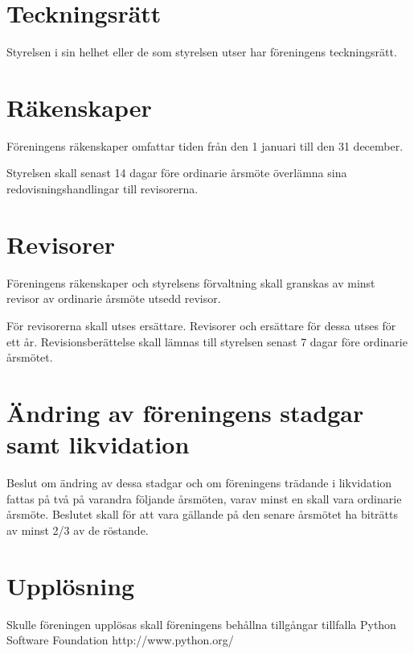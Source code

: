 \documentclass[11pt, a4paper]{article}
\begin{document}
\section{Teckningsrätt}
Styrelsen i sin helhet eller de som styrelsen utser har föreningens teckningsrätt.

\section{Räkenskaper}
Föreningens räkenskaper omfattar tiden från den 1 januari till den 31 december.

Styrelsen skall senast 14 dagar före ordinarie årsmöte överlämna sina redovisningshandlingar
till revisorerna.

\section{Revisorer}
Föreningens räkenskaper och styrelsens förvaltning skall granskas av minst revisor av ordinarie årsmöte utsedd revisor.

För revisorerna skall utses ersättare. Revisorer och ersättare för dessa utses för ett år. Revisionsberättelse skall lämnas till styrelsen senast 7 dagar före ordinarie årsmötet.

\section{Ändring av föreningens stadgar samt likvidation}
Beslut om ändring av dessa stadgar och om föreningens trädande i likvidation fattas på två på varandra följande årsmöten, varav minst en skall vara ordinarie årsmöte. Beslutet skall för att vara gällande på den senare årsmötet ha biträtts av minst 2/3 av de röstande.

\section{Upplösning}
Skulle föreningen upplösas skall föreningens behållna tillgångar tillfalla Python Software Foundation http://www.python.org/
\end{document}
